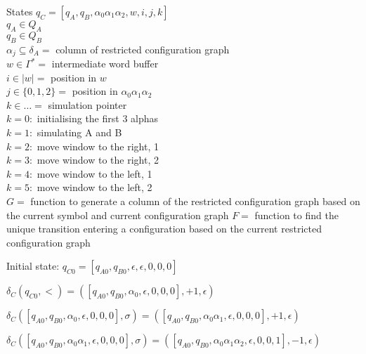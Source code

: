 \documentclass[12pt, a4paper]{article}
\begin{document}
\begin{algorithmic}
    \STATE States $q_C = [q_A, q_B, \alpha_0 \alpha_1 \alpha_2, w, i, j, k]$\\
    \STATE $q_A \in Q_A$\\
    \STATE $q_B \in Q_B$\\
    \STATE $\alpha_j \subseteq \delta_A = $ column of restricted configuration graph\\
    \STATE $w \in \Gamma^* = $ intermediate word buffer\\
    \STATE $i \in |w| = $ position in $w$\\
    \STATE $j \in \{0,1,2\} = $ position in $\alpha_0 \alpha_1 \alpha_2$\\
    \STATE $k \in \dots = $ simulation pointer\\
    \STATE $k = 0 : $ initialising the first 3 alphas\\
    \STATE $k = 1 : $ simulating A and B\\
    \STATE $k = 2 : $ move window to the right, 1\\
    \STATE $k = 3 : $ move window to the right, 2\\
    \STATE $k = 4 : $ move window to the left, 1\\
    \STATE $k = 5 : $ move window to the left, 2\\
    \STATE $G = $ function to generate a column of the restricted configuration graph based on the current symbol and current configuration graph
    \STATE $F = $ function to find the unique transition entering a configuration based on the current restricted configuration graph

    \STATE Initial state: $q_{C0} = [q_{A0}, q_{B0}, \epsilon, \epsilon, 0, 0, 0]$

    \STATE $\delta_C(q_{C0}, <) = ([q_{A0}, q_{B0}, \alpha_0, \epsilon, 0,0,0], +1, \epsilon)$

    \STATE $\delta_C([q_{A0}, q_{B0}, \alpha_0, \epsilon, 0,0,0], \sigma) = ([q_{A0}, q_{B0}, \alpha_0 \alpha_1, \epsilon, 0,0,0], +1, \epsilon)$

    \STATE $\delta_C([q_{A0}, q_{B0}, \alpha_0 \alpha_1, \epsilon, 0,0,0], \sigma) = ([q_{A0}, q_{B0}, \alpha_0 \alpha_1 \alpha_2, \epsilon, 0,0,1], -1, \epsilon)$\\


\end{algorithmic}
\end{document}
